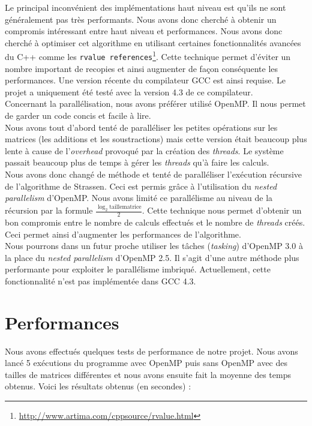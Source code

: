 \documentclass[a4paper, 12pt]{article}
\begin{document}
Le principal inconvénient des implémentations haut niveau est qu'ils
ne sont généralement pas très performants. Nous avons donc cherché à
obtenir un compromis intéressant entre haut niveau et performances.
Nous avons donc cherché à optimiser cet algorithme en utilisant
certaines fonctionnalités avancées du C++ comme les \texttt{rvalue
  references}\footnote{\url{http://www.artima.com/cppsource/rvalue.html}}.
Cette technique permet d'éviter un nombre important de recopies et
ainsi augmenter de façon conséquente les performances. Une version
récente du compilateur GCC est ainsi requise. Le projet a uniquement
été testé avec la version 4.3 de ce compilateur. \\

Concernant la parallélisation, nous avons préférer utilisé OpenMP. Il
nous permet de garder un code concis et facile à lire. \\

Nous avons tout d'abord tenté de paralléliser les petites opérations
sur les matrices (les additions et les soustractions) mais cette
version était beaucoup plus lente à cause de l'\textit{overhead}
provoqué par la création des \textit{threads}. Le système passait
beaucoup plus de temps à gérer les \textit{threads} qu'à faire les calculs. \\

Nous avons donc changé de méthode et tenté de paralléliser l'exécution
récursive de l'algorithme de Strassen. Ceci est permis grâce à
l'utilisation du \textit{nested parallelism} d'OpenMP. Nous avons
limité ce parallélisme au niveau de la récursion par la formule $
\frac{\log_2 \mathrm{taillematrice}}{2} $. Cette technique nous permet
d'obtenir un bon compromis entre le nombre de calculs effectués et le
nombre de \textit{threads} créés. Ceci permet ainsi d'augmenter les
performances de l'algorithme. \\

Nous pourrons dans un futur proche utiliser les tâches
(\textit{tasking}) d'OpenMP 3.0 à la place du \textit{nested
  parallelism} d'OpenMP 2.5. Il s'agit d'une autre méthode plus
performante pour exploiter le parallélisme imbriqué. Actuellement,
cette fonctionnalité n'est pas implémentée dans GCC 4.3.

\pagebreak

\section{Performances}

Nous avons effectués quelques tests de performance de notre projet.
Nous avons lancé 5 exécutions du programme avec OpenMP puis sans
OpenMP avec des tailles de matrices différentes et nous avons ensuite
fait la moyenne des temps obtenus. Voici les résultats obtenus (en
secondes) :
\end{document}
